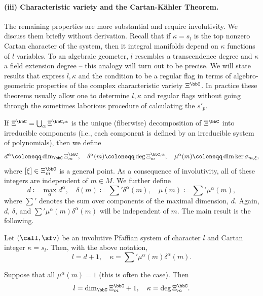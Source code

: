 \paragraph{(iii) Characteristic variety and the Cartan-K\"ahler Theorem.} The remaining properties are more substantial and require involutivity. We discuss them briefly without derivation. Recall that if $\kappa=s_l$ is the top nonzero Cartan character of the system, then it integral manifolds depend on $\kappa$ functions of $l$ variables. To an algebraic geometer, $l$ resembles a transcendence degree and $\kappa$ a field extension degree -- this analogy will turn out to be precise. We will state results that express $l,\kappa$ and the condition to be a regular flag in terms of algebro-geometric properties of the complex characteristic variety $\Xi^\bbC$. In practice these theorems usually allow one to determine $l,\kappa$ and regular flags without going through the sometimes laborious procedure of calculating the $s'_p$. 

If $\Xi^\bbC=\bigcup_\alpha \Xi^{\bbC,\alpha}$ is the unique (fiberwise) decomposition of $\Xi^\bbC$ into irreducible components (i.e., each component is defined by an irreducible system of polynomials), then we define 
\[d^\alpha\coloneqq \dim_\bbC\Xi^\bbC_m,\quad \delta^\alpha(m)\coloneqq \deg \Xi_m^{\bbC,\alpha},\quad \mu^\alpha(m)\coloneqq \dim\ker\sigma_{m,\xi},\]
where $[\xi]\in \Xi^\bbC_m$ is a general point. As a consequence of involutivity, all of these integers are independent of $m\in M$. We further define 
\[d\coloneqq \max_\alpha d^\alpha,\quad \delta(m)\coloneqq \sum{}'\delta^\alpha(m),\quad\mu(m)\coloneqq \sum{}'\mu^\alpha(m),\]
where $\sum{}'$ denotes the sum over components of the maximal dimension, $d$. Again, $d$, $\delta$, and $\sum{}'\mu^\alpha(m)\delta^\alpha(m)$ will be independent of $m$. The main result is the following.

\begin{thm}\label{thm v.3.6. Bryant}
    Let $(\calI,\sfv)$ be an involutive Pfaffian system of character $l$ and Cartan integer $\kappa=s_l$. Then, with the above notation, 
    \[l=d+1,\quad \kappa=\sum{}'\mu^\alpha(m)\delta^\alpha(m).\]
\end{thm}

\begin{cor}
    Suppose that all $\mu^\alpha(m)=1$ (this is often the case). Then 
    \[l=\dim_\bbC \Xi^\bbC_m+1,\quad \kappa=\deg \Xi^\bbC_m.\]
\end{cor}

